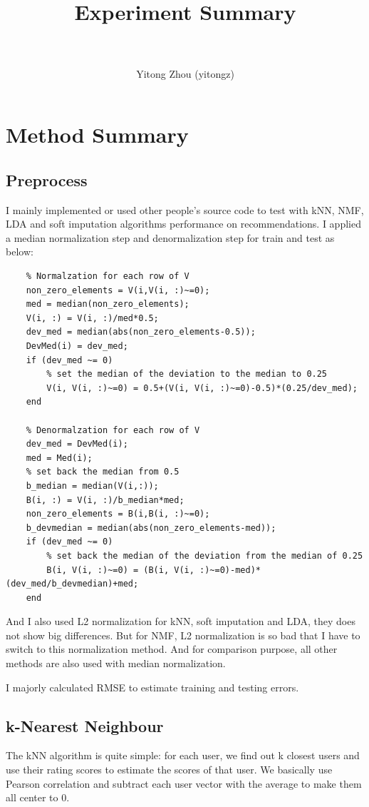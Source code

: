 \documentclass[paper=a4, fontsize=11pt]{scrartcl}
\title{
        \usefont{OT1}{bch}{b}{n}
        \normalfont \normalsize \textsc{} \\ [25pt]
        \horrule{0.5pt} \\[0.4cm]
        \huge Experiment Summary \\
        \horrule{2pt} \\[0.5cm]
}
\author{
        \normalfont                                 \normalsize
        Yitong Zhou (yitongz)\\[-3pt]       \normalsize
}
\numberwithin{equation}{section}        %
\numberwithin{figure}{section}          %
\numberwithin{table}{section}               %
\begin{document}
\maketitle

\section{Method Summary}
\subsection{Preprocess}
I mainly implemented or used other people's source code to test with kNN, NMF, LDA and soft imputation algorithms performance on recommendations. I applied a median normalization step and denormalization step for train and test as below:
\begin{verbatim}
    % Normalzation for each row of V
    non_zero_elements = V(i,V(i, :)~=0);
    med = median(non_zero_elements);
    V(i, :) = V(i, :)/med*0.5;
    dev_med = median(abs(non_zero_elements-0.5));
    DevMed(i) = dev_med;
    if (dev_med ~= 0)
        % set the median of the deviation to the median to 0.25
        V(i, V(i, :)~=0) = 0.5+(V(i, V(i, :)~=0)-0.5)*(0.25/dev_med);
    end
    
    % Denormalzation for each row of V
    dev_med = DevMed(i);
    med = Med(i);
    % set back the median from 0.5
    b_median = median(V(i,:));
    B(i, :) = V(i, :)/b_median*med;
    non_zero_elements = B(i,B(i, :)~=0);
    b_devmedian = median(abs(non_zero_elements-med));
    if (dev_med ~= 0)
        % set back the median of the deviation from the median of 0.25
        B(i, V(i, :)~=0) = (B(i, V(i, :)~=0)-med)*(dev_med/b_devmedian)+med;
    end
\end{verbatim}

And I also used L2 normalization for kNN, soft imputation and LDA, they does not show big differences. But for NMF, L2 normalization is so bad that I have to switch to this normalization method. And for comparison purpose, all other methods are also used with median normalization.

I majorly calculated RMSE to estimate training and testing errors.
\subsection{k-Nearest Neighbour}
The kNN algorithm is quite simple: for each user, we find out k closest users and use their rating scores to estimate the scores of that user. We basically use Pearson correlation and subtract each user vector with the average to make them all center to 0.
\end{document}
